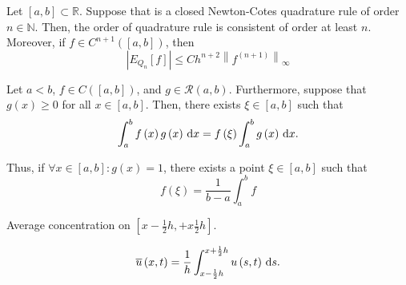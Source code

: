 \begin{frame}
    \begin{theorem}
        Let $\left[a,b\right]\subset\mathbb{R}$.
        Suppose that is a closed Newton-Cotes quadrature rule of
        order $n\in\mathbb{N}$.
        Then, the order of quadrature rule is consistent of order at
        least $n$.
        Moreover, if $f\in C^{n+1}\left(\left[a,b\right]\right)$, then
        \begin{equation*}
            \left|
            E_{Q_{n}}
            \left[f\right]
            \right|\leq
            C
            h^{n+2}
            {\left\|f^{\left(n+1\right)}\right\|}_{\infty}
        \end{equation*}
    \end{theorem}
\end{frame}

\begin{frame}
    \begin{theorem}
        Let $a<b$,
        \begin{math}
            f\in C\left(\left[a,b\right]\right)
        \end{math},
        and
        \begin{math}
            g\in
            \mathcal{R}\left(a,b\right)
        \end{math}.
        Furthermore, suppose that $g\left(x\right)\geq0$ for all
        $x\in\left[a,b\right]$.
        Then, there exists $\xi\in\left[a,b\right]$ such that
        \begin{equation*}
            \int_{a}^{b}
            f\left(x\right)
            g\left(x\right)
            \dl x=
            f\left(\xi\right)
            \int_{a}^{b}
            g\left(x\right)
            \dl x.
        \end{equation*}

        Thus, if $\forall x\in\left[a,b\right]:g\left(x\right)=1$,
        there exists a point $\xi\in\left[a,b\right]$ such that
        \begin{equation*}
            f\left(\xi\right)=
            \dfrac{1}{b-a}
            \int_{a}^{b}
            f
        \end{equation*}
    \end{theorem}

    \begin{definition}
        Average concentration on
        \begin{math}
            \left[
                x-\frac{1}{2}h,
                +x\frac{1}{2}h
                \right]
        \end{math}.

        \begin{equation*}
            \overline{u}
            \left(x,t\right)=
            \dfrac{1}{h}
            \int_{x-\frac{1}{2}h}^{x+\frac{1}{2}h}
            u\left(s,t\right)
            \dl s.
        \end{equation*}
    \end{definition}
\end{frame}

